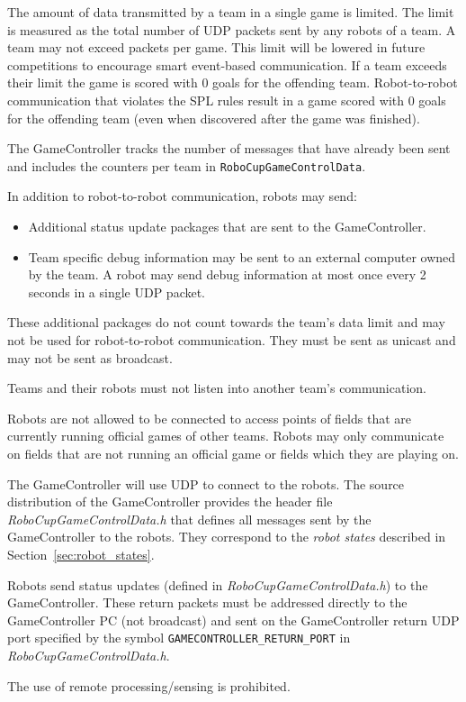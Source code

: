The amount of data transmitted by a team in a single game is limited. The limit is measured as the total number of UDP packets sent by any robots of a team. A team may not exceed \TeamMessageLimit packets per game. This limit will be lowered in future competitions to encourage smart event-based communication. If a team exceeds their limit the game is scored with 0 goals for the offending team. Robot-to-robot communication that violates the SPL rules result in a game scored with 0 goals for the offending team (even when discovered after the game was finished).

The GameController tracks the number of messages that have already been sent and includes the counters per team in \texttt{RoboCupGameControlData}.

In addition to robot-to-robot communication, robots may send:
\begin{itemize}
 \item Additional status update packages that are sent to the GameController.
 \item Team specific debug information may be sent to an external computer owned by the team. A robot may send debug information at most once every 2 seconds in a single UDP packet.
\end{itemize}
These additional packages do not count towards the team's data limit and may not be used for robot-to-robot communication. They must be sent as unicast and may not be sent as broadcast.

Teams and their robots must not listen into another team's communication.

Robots are not allowed to be connected to access points of fields that are currently running official games of other teams.
Robots may only communicate on fields that are not running an official game or fields which they are playing on.

The GameController will use UDP to connect to the robots. The source distribution of the GameController provides the header file \emph{RoboCupGameControlData.h} that defines all messages sent by the GameController to the robots. They correspond to the \emph{robot states} described in Section~\ref{sec:robot_states}.

Robots send status updates (defined in \emph{RoboCupGameControlData.h}) to the GameController. These return packets must be addressed directly to the GameController PC (\ie not broadcast) and sent on the GameController return UDP port specified by the symbol \verb!GAMECONTROLLER_RETURN_PORT! in \emph{RoboCupGameControlData.h}.

The use of remote processing/sensing is prohibited.
